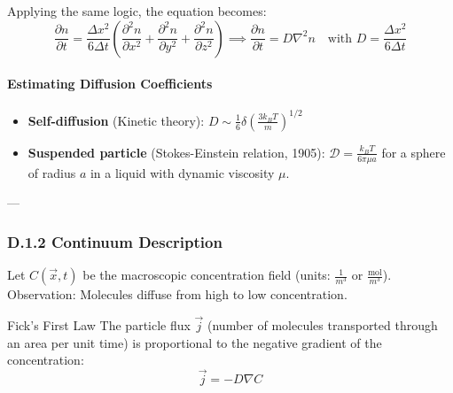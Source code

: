 \begin{center}
\end{center}

Applying the same logic, the equation becomes:
\[
\frac{\partial n}{\partial t} = \frac{\Delta x^{2}}{6\Delta t} \left(\frac{\partial^{2}n}{\partial x^{2}} + \frac{\partial^{2}n}{\partial y^{2}} + \frac{\partial^{2}n}{\partial z^{2}}\right) \implies \frac{\partial n}{\partial t} = D \nabla^{2}n \quad \text{with } D = \frac{\Delta x^{2}}{6\Delta t}
\]

\paragraph{Estimating Diffusion Coefficients}
\begin{itemize}
    \item \textbf{Self-diffusion} (Kinetic theory): $D \sim \frac{1}{6}\delta \left(\frac{3k_{B}T}{m}\right)^{1/2}$
    \item \textbf{Suspended particle} (Stokes-Einstein relation, 1905): $\mathcal{D} = \frac{k_{B}T}{6\pi\mu a}$ for a sphere of radius $a$ in a liquid with dynamic viscosity $\mu$.
\end{itemize}

---

\subsubsection{D.1.2 Continuum Description}
Let $C(\vec{x},t)$ be the macroscopic concentration field (units: $\frac{1}{m^3}$ or $\frac{\text{mol}}{m^3}$).
Observation: Molecules diffuse from high to low concentration.

\begin{defbox}{Fick's First Law}
The particle flux $\vec{j}$ (number of molecules transported through an area per unit time) is proportional to the negative gradient of the concentration:
\[
\vec{j} = -D\nabla C
\]
\end{defbox}

